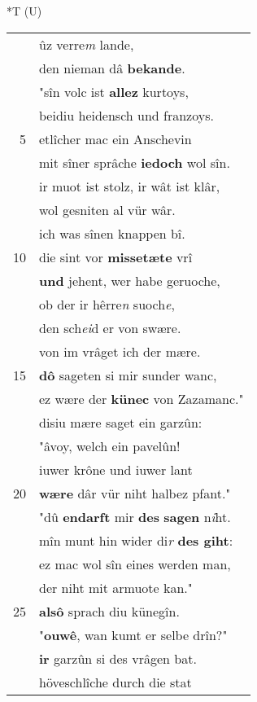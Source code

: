 \documentclass[8pt,a4paper,notitlepage]{article}
\begin{document}
\begin{table}[ht]
\begin{minipage}[t]{0.5\linewidth}
\end{minipage}
\hspace{0.5cm}
\begin{minipage}[t]{0.5\linewidth}
\small
\begin{center}*T (U)
\end{center}
\begin{tabular}{rl}
 & ûz verre\textit{m} lande,\\ 
 & den nieman dâ \textbf{bekande}.\\ 
 & "sîn volc ist \textbf{allez} kurtoys,\\ 
 & beidiu heidensch und franzoys.\\ 
5 & etlîcher mac ein Anschevin\\ 
 & mit sîner sprâche \textbf{iedoch} wol sîn.\\ 
 & ir muot ist stolz, ir wât ist klâr,\\ 
 & wol gesniten al vür wâr.\\ 
 & ich was sînen knappen bî.\\ 
10 & die sint vor \textbf{missetæte} vrî\\ 
 & \textbf{und} jehent, wer habe geruoche,\\ 
 & ob der ir hêrre\textit{n} suoch\textit{e},\\ 
 & den sch\textit{ei}d er von swære.\\ 
 & von im vrâget ich der mære.\\ 
15 & \textbf{dô} sageten si mir sunder wanc,\\ 
 & ez wære der \textbf{künec} von Zazamanc."\\ 
 & disiu mære saget ein garzûn:\\ 
 & "âvoy, welch ein pavelûn!\\ 
 & iuwer krône und iuwer lant\\ 
20 & \textbf{wære} dâr vür niht halbez pfant."\\ 
 & "dû \textbf{en}\textbf{darft} mir \textbf{des} \textbf{sagen} n\textit{i}ht.\\ 
 & mîn munt hin wider di\textit{r} \textbf{des giht}:\\ 
 & ez mac wol sîn eines werden man,\\ 
 & der niht mit armuote kan."\\ 
25 & \textbf{alsô} sprach diu künegîn.\\ 
 & "\textbf{ouwê}, wan kumt er selbe drîn?"\\ 
 & \textbf{ir} garzûn si des vrâgen bat.\\ 
 & höveschlîche durch die stat\\ 

\end{tabular}
\end{minipage}
\end{table}
\end{document}
